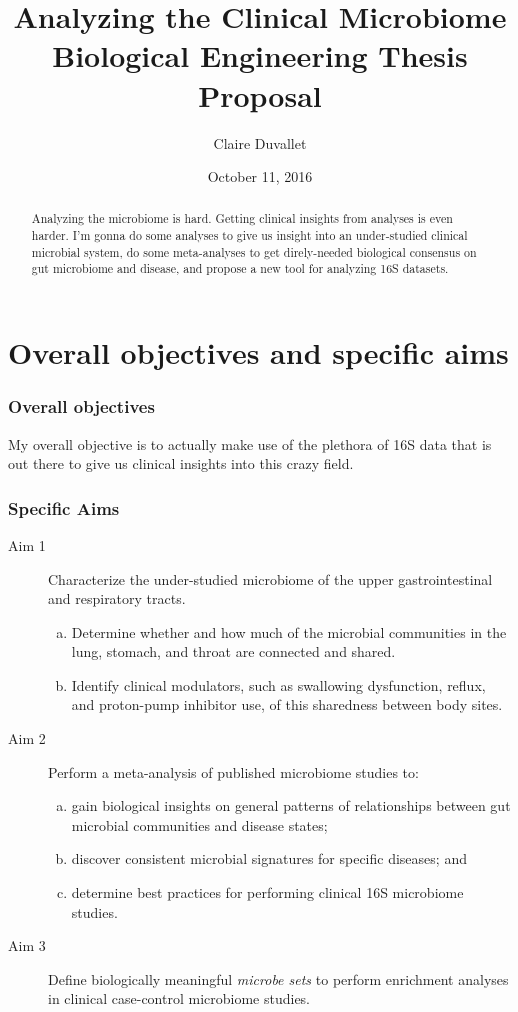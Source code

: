 \documentclass[12pt]{report}
\title{Analyzing the Clinical Microbiome \\ Biological Engineering Thesis Proposal}
\author{Claire Duvallet}
\date{October 11, 2016}
\begin{document}
\maketitle

\begin{abstract}
Analyzing the microbiome is hard. Getting clinical insights from analyses is even harder. I'm gonna do some analyses to give us insight into an under-studied clinical microbial system, do some meta-analyses to get direly-needed biological consensus on gut microbiome and disease, and propose a new tool for analyzing 16S datasets.
\end{abstract}

\tableofcontents

\chapter*{Overall objectives and specific aims}
\subsection*{Overall objectives}
My overall objective is to actually make use of the plethora of 16S data that is out there to give us clinical insights into this crazy field.

\subsection*{Specific Aims}
\begin{description}
	\item[Aim 1] Characterize the under-studied microbiome of the upper gastrointestinal and respiratory tracts.
		\begin{enumerate}[(a)]
			\item  Determine whether and how much of the microbial communities in the lung, stomach, and throat are connected and shared.
			\item Identify clinical modulators, such as swallowing dysfunction, reflux, and proton-pump inhibitor use, of this sharedness between body sites.
		\end{enumerate}
	\item[Aim 2] Perform a meta-analysis of published microbiome studies to:
	\begin{enumerate}[(a)]
		\item gain biological insights on general patterns of relationships between gut microbial communities and disease states;
		\item discover consistent microbial signatures for specific diseases; and
		\item determine best practices for performing clinical 16S microbiome studies.
	\end{enumerate}
	\item[Aim 3] Define biologically meaningful \textit{microbe sets} to perform enrichment analyses in clinical case-control microbiome studies.
\end{description}
\end{document}
